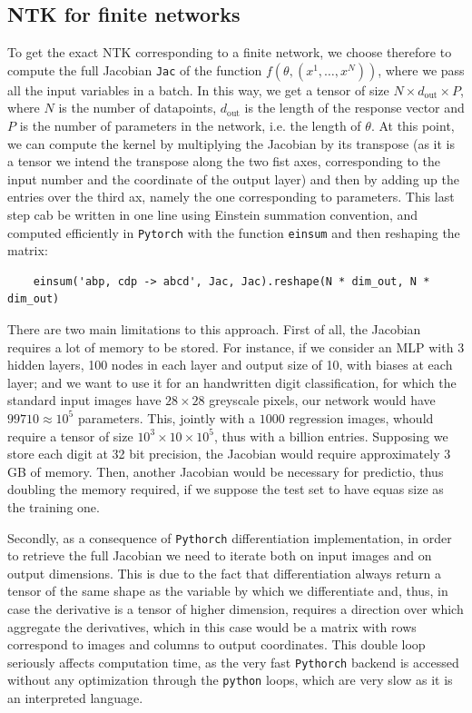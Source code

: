 \documentclass[11pt,notitlepage]{article}
\numberwithin{equation}{section}
\theoremstyle{remark}
\theoremstyle{definition}
\begin{document}
	\subsection{NTK for finite networks}\label{subsec:finiteImpl}
	To get the exact NTK corresponding to a finite network, we choose therefore to compute the full Jacobian \verb|Jac| of the function $f(\theta, (x^1, \dots, x^N))$, where we pass all the input variables in a batch.
	In this way, we get a tensor of size $N \times d_\text{out} \times P$, where $N$ is the number of datapoints, $d_\text{out}$ is the length of the response vector and $P$ is the number of parameters in the network, i.e. the length of $\theta$.
	At this point, we can compute the kernel by multiplying the Jacobian by its transpose (as it is a tensor we intend the transpose along the two fist axes, corresponding to the input number and the coordinate of the output layer) and then by adding up the entries over the third ax, namely the one corresponding to parameters.
	This last step cab be written in one line using Einstein summation convention, and computed efficiently in \verb|Pytorch| with the function \verb|einsum| and then reshaping the matrix:
	\begin{verbatim}
	einsum('abp, cdp -> abcd', Jac, Jac).reshape(N * dim_out, N * dim_out)
	\end{verbatim}
	
	There are two main limitations to this approach.
	First of all, the Jacobian requires a lot of memory to be stored.
	For instance, if we consider an MLP with 3 hidden layers, 100 nodes in each layer and output size of 10, with biases at each layer; and we want to use it for an handwritten digit classification, for which the standard input images have $28 \times 28$ greyscale pixels, our network would have $99710 \approx 10^5$ parameters.
	This, jointly with a $1000$ regression images, whould require a tensor of size $10^3 \times 10 \times 10^5$, thus with a billion entries.
	Supposing we store each digit at 32 bit precision, the Jacobian would require approximately $3$GB of memory.
	Then, another Jacobian would be necessary for predictio, thus doubling the memory required, if we suppose the test set to have equas size as the training one.
	
	Secondly, as a consequence of \verb|Pythorch| differentiation implementation, in order to retrieve the full Jacobian we need to iterate both on input images and on output dimensions.
	This is due to the fact that differentiation always return a tensor of the same shape as the variable by which we differentiate and, thus, in case the derivative is a tensor of higher dimension, requires a direction over which aggregate the derivatives, which in this case would be a matrix with rows correspond to images and columns to output coordinates.
	This double loop seriously affects computation time, as the very fast \verb|Pythorch| backend is accessed without any optimization through the \verb|python| loops, which are very slow as it is an interpreted language.
	
\end{document}
